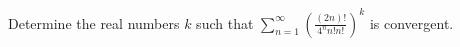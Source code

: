 Determine the real numbers $k$ such that $\displaystyle \sum_{n=1}^\infty
\left( \frac{(2n)!}{4^n n! n!} \right)^k$ is convergent.
